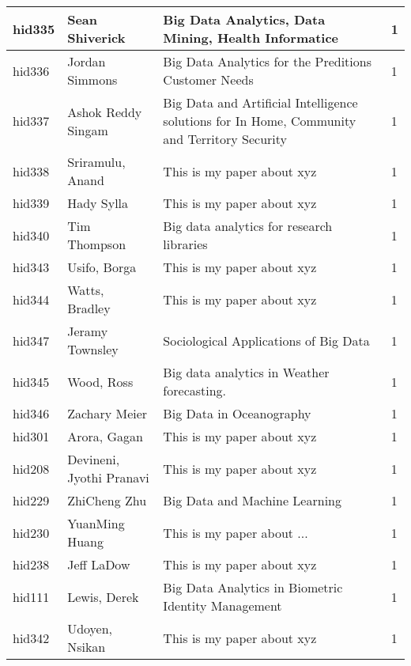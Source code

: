 \documentclass[12pt]{article}
\begin{document}
\begin{footnotesize}
\begin{longtable}{|p{1cm}p{5cm}p{9cm}p{1cm}|}
\hline
hid335 & Sean Shiverick & Big Data Analytics, Data Mining, Health Informatice & 1 \\
\hline
hid336 & Jordan Simmons & Big Data Analytics for the Preditions Customer Needs & 1 \\
\hline
hid337 & Ashok Reddy Singam & Big Data and Artificial Intelligence solutions for In Home, Community and Territory Security & 1 \\
\hline
hid338 & Sriramulu, Anand & This is my paper about xyz & 1 \\
\hline
hid339 & Hady Sylla & This is my paper about xyz & 1 \\
\hline
hid340 & Tim Thompson & Big data analytics for research libraries & 1 \\
\hline
hid343 & Usifo, Borga & This is my paper about xyz & 1 \\
\hline
hid344 & Watts, Bradley & This is my paper about xyz & 1 \\
\hline
hid347 & Jeramy Townsley & Sociological Applications of Big Data & 1 \\
\hline
hid345 & Wood, Ross & Big data analytics in Weather forecasting. & 1 \\
\hline
hid346 & Zachary Meier & Big Data in Oceanography & 1 \\
\hline
hid301 & Arora, Gagan & This is my paper about xyz & 1 \\
\hline
hid208 & Devineni, Jyothi Pranavi & This is my paper about xyz & 1 \\
\hline
hid229 & ZhiCheng Zhu & Big Data and Machine Learning & 1 \\
\hline
hid230 & YuanMing Huang & This is my paper about ... & 1 \\
\hline
hid238 & Jeff LaDow & This is my paper about xyz & 1 \\
\hline
hid111 & Lewis, Derek & Big Data Analytics in Biometric Identity Management & 1 \\
\hline
hid342 & Udoyen, Nsikan & This is my paper about xyz & 1 \\
\hline
\end{longtable}
\end{footnotesize}
\newpage
\end{document}
